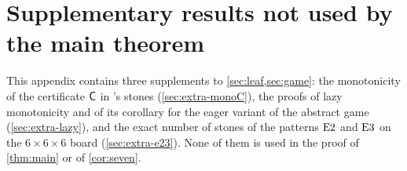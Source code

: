 \section{Supplementary results not used by the main theorem}\label{sec:extra}

This appendix contains three supplements to \cref{sec:leaf,sec:game}: the monotonicity of the certificate
$\mathsf{C}$ in \Breaker's stones (\cref{sec:extra-monoC}), the proofs of lazy monotonicity and of its corollary
for the eager variant of the abstract game (\cref{sec:extra-lazy}), and the exact number of stones of the
patterns $\mathrm{E2}$ and $\mathrm{E3}$ on the $6\times6\times6$ board (\cref{sec:extra-e23}). None of them is used
in the proof of \cref{thm:main} or of \cref{cor:seven}.



